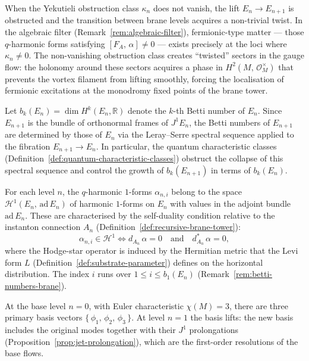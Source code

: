 \begin{remark}
\label{rem:fermionic-twisted-sectors}
When the Yekutieli obstruction class $\kappa_n$ does not vanish, the
lift $E_n \to E_{n+1}$ is obstructed and the transition between brane
levels acquires a non-trivial twist.  In the algebraic filter
(Remark~\ref{rem:algebraic-filter}), fermionic-type matter --- those
$q$-harmonic forms satisfying $[F_A,\, \alpha] \neq 0$ --- exists
precisely at the loci where $\kappa_n \neq 0$.  The non-vanishing
obstruction class creates ``twisted'' sectors in the gauge flow: the
holonomy around these sectors acquires a phase in
$H^2(M,\, \mathcal{O}_M^{\times})$ that prevents the vortex filament
from lifting smoothly, forcing the localisation of fermionic excitations
at the monodromy fixed points of the brane tower.
\end{remark}


\begin{remark}
\label{rem:betti-numbers-brane}
Let $b_k(E_n) = \dim H^k(E_n, \mathbb{R})$ denote the $k$-th Betti number of
$E_n$.  Since $E_{n+1}$ is the bundle of orthonormal frames of $J^1 E_n$, the
Betti numbers of $E_{n+1}$ are determined by those of $E_n$ via the Leray--Serre
spectral sequence applied to the fibration
$E_{n+1} \to E_n$.  In particular, the quantum characteristic classes
(Definition~\ref{def:quantum-characteristic-classes}) obstruct the collapse of
this spectral sequence and control the growth of $b_k(E_{n+1})$ in terms of
$b_k(E_n)$.
\end{remark}


\begin{remark}
\label{rem:q-harmonic-basis-brane}
For each level $n$, the $q$-harmonic $1$-forms $\alpha_{n,i}$ belong to the
space $\mathcal{H}^1(E_n,\, \mathrm{ad}\, E_n)$ of harmonic $1$-forms on
$E_n$ with values in the adjoint bundle $\mathrm{ad}\, E_n$.  These are
characterised by the self-duality condition relative to the instanton
connection $A_n$
(Definition~\ref{def:recursive-brane-tower}):
\[
  \alpha_{n,i} \in \mathcal{H}^1
  \iff
  d_{A_n}\,\alpha = 0
  \quad\text{and}\quad
  d_{A_n}^*\,\alpha = 0,
\]
where the Hodge-star operator is induced by the Hermitian metric that the
Levi form $L$ (Definition~\ref{def:substrate-parameter}) defines on the
horizontal distribution.
The index $i$ runs over $1 \leq i \leq b_1(E_n)$
(Remark~\ref{rem:betti-numbers-brane}).

At the base level $n = 0$, with Euler characteristic $\chi(M) = 3$, there are
three primary basis vectors $\{\,\phi_1,\, \phi_2,\, \phi_3\,\}$.  At
level $n = 1$ the basis lifts: the new basis includes the original modes
together with their $J^1$ prolongations
(Proposition~\ref{prop:jet-prolongation}), which are the first-order
resolutions of the base flows.
\end{remark}

